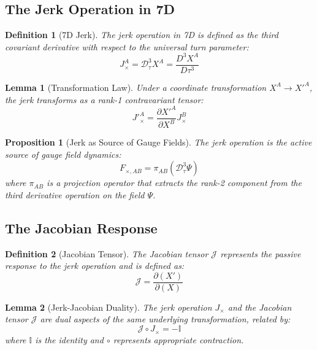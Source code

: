 \documentclass{article}
\newtheorem{proposition}{Proposition}
\newtheorem{lemma}{Lemma}
\newtheorem{definition}{Definition}
\begin{document}
\subsection{The Jerk Operation in 7D}

\begin{definition}[7D Jerk]
The jerk operation in 7D is defined as the third covariant derivative with respect to the universal turn parameter:
\begin{equation}
J^A_{\times} = \mathcal{D}_\tau^3 X^A = \frac{D^3 X^A}{D\tau^3}
\end{equation}
\end{definition}

\begin{lemma}[Transformation Law]
Under a coordinate transformation $X^A \to X'^A$, the jerk transforms as a rank-1 contravariant tensor:
\begin{equation}
J'^A_{\times} = \frac{\partial X'^A}{\partial X^B} J^B_{\times}
\end{equation}
\end{lemma}

\begin{proposition}[Jerk as Source of Gauge Fields]
The jerk operation is the active source of gauge field dynamics:
\begin{equation}
F_{\times,AB} = \pi_{AB}(\mathcal{D}_\tau^3 \Psi)
\end{equation}
where $\pi_{AB}$ is a projection operator that extracts the rank-2 component from the third derivative operation on the field $\Psi$.
\end{proposition}

\subsection{The Jacobian Response}

\begin{definition}[Jacobian Tensor]
The Jacobian tensor $\mathcal{J}$ represents the passive response to the jerk operation and is defined as:
\begin{equation}
\mathcal{J} = \frac{\partial (X')}{\partial (X)}
\end{equation}
\end{definition}

\begin{lemma}[Jerk-Jacobian Duality]
The jerk operation $J_{\times}$ and the Jacobian tensor $\mathcal{J}$ are dual aspects of the same underlying transformation, related by:
\begin{equation}
\mathcal{J} \circ J_{\times} = -\mathbb{I}
\end{equation}
where $\mathbb{I}$ is the identity and $\circ$ represents appropriate contraction.
\end{lemma}
\end{document}
